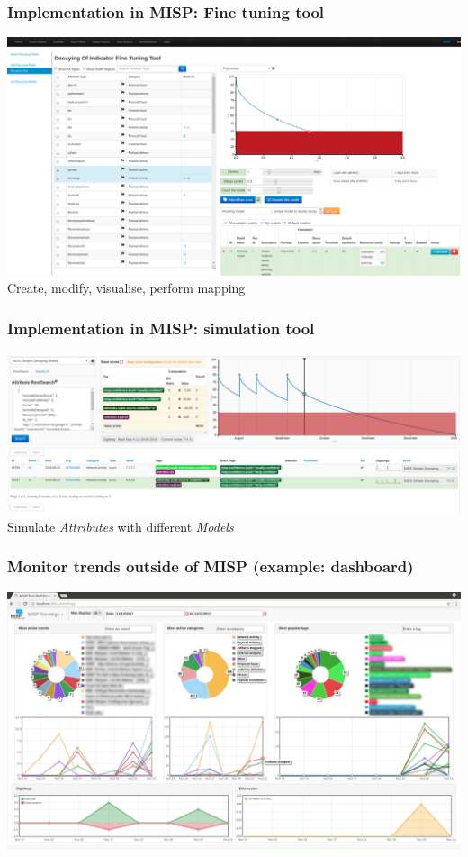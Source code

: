 \begin{frame}
    \frametitle{Implementation in MISP: Fine tuning tool}
    \includegraphics[width=1.00\linewidth]{decaying-tool.png}
    Create, modify, visualise, perform mapping
\end{frame}

\begin{frame}
    \frametitle{Implementation in MISP: simulation tool}
    \includegraphics[width=1.00\linewidth]{decaying-simulation.png}
    Simulate \textit{Attributes} with different \textit{Models}
\end{frame}

\begin{frame}
  \frametitle{Monitor trends outside of MISP (example: dashboard)}
  \begin{center}
    \includegraphics[scale=0.18]{dashboard-trendings.png}
  \end{center}
\end{frame}


